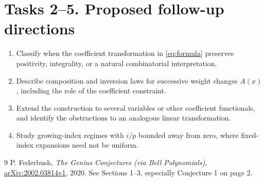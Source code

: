 \documentclass[11pt]{article}
\begin{document}
\section*{Tasks 2--5. Proposed follow-up directions}
\begin{enumerate}[label=\textbf{Task \arabic*.},start=2,leftmargin=*]
\item Classify when the coefficient transformation in
\eqref{eq:formula} preserves positivity, integrality, or a natural
combinatorial interpretation.
\item Describe composition and inversion laws for successive weight
changes $A(x)$, including the role of the coefficient constraint.
\item Extend the construction to several variables or other
coefficient functionals, and identify the obstructions to an analogous
linear transformation.
\item Study growing-index regimes with $i/p$ bounded away from zero,
where fixed-index expansions need not be uniform.
\end{enumerate}
\begin{thebibliography}{9}
 P. Federbush, \emph{The Genius Conjectures (via Bell
Polynomials)}, \href{https://arxiv.org/abs/2002.03814v1}{arXiv:2002.03814v1},
2020. See Sections 1--3, especially Conjecture 1 on page 2.
\end{thebibliography}
\end{document}
